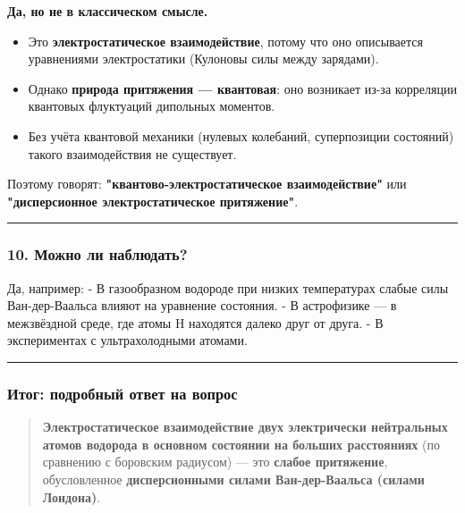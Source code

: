 \documentclass[11pt]{article}
\providecommand{\tightlist}{%
      \setlength{\itemsep}{0pt}\setlength{\parskip}{0pt}}
\begin{document}
\textbf{Да, но не в классическом смысле.}

\begin{itemize}
\tightlist
\item
  Это \textbf{электростатическое взаимодействие}, потому что оно
  описывается уравнениями электростатики (Кулоновы силы между зарядами).
\item
  Однако \textbf{природа притяжения --- квантовая}: оно возникает из-за
  корреляции квантовых флуктуаций дипольных моментов.
\item
  Без учёта квантовой механики (нулевых колебаний, суперпозиции
  состояний) такого взаимодействия не существует.
\end{itemize}

Поэтому говорят: \textbf{"квантово-электростатическое взаимодействие"}
или \textbf{"дисперсионное электростатическое притяжение"}.

\begin{center}\rule{0.5\linewidth}{\linethickness}\end{center}

\subsubsection{10. Можно ли
наблюдать?}\label{ux43cux43eux436ux43dux43e-ux43bux438-ux43dux430ux431ux43bux44eux434ux430ux442ux44c}

Да, например: - В газообразном водороде при низких температурах слабые
силы Ван-дер-Ваальса влияют на уравнение состояния. - В астрофизике ---
в межзвёздной среде, где атомы H находятся далеко друг от друга. - В
экспериментах с ультрахолодными атомами.

\begin{center}\rule{0.5\linewidth}{\linethickness}\end{center}

\subsubsection{Итог: подробный ответ на
вопрос}\label{ux438ux442ux43eux433-ux43fux43eux434ux440ux43eux431ux43dux44bux439-ux43eux442ux432ux435ux442-ux43dux430-ux432ux43eux43fux440ux43eux441}

\begin{quote}
\textbf{Электростатическое взаимодействие двух электрически нейтральных
атомов водорода в основном состоянии на больших расстояниях} (по
сравнению с боровским радиусом) --- это \textbf{слабое притяжение},
обусловленное \textbf{дисперсионными силами Ван-дер-Ваальса (силами
Лондона)}.
\end{quote}
\end{document}
